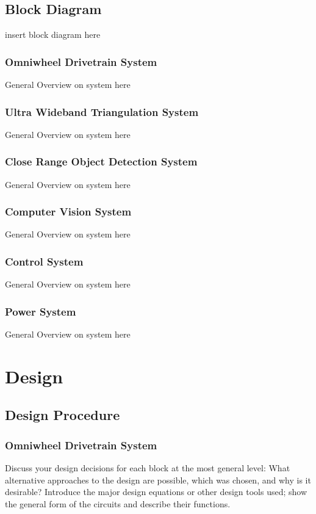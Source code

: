 \documentclass{report}
\begin{document}
    \section{Block Diagram}
    insert block diagram here 

    \subsection{Omniwheel Drivetrain System}
    General Overview on system here

    \subsection{Ultra Wideband Triangulation System}
    General Overview on system here
    
    \subsection{Close Range Object Detection System}
    General Overview on system here
    
    \subsection{Computer Vision System}
    General Overview on system here
    
    \subsection{Control System}
    General Overview on system here
    
    \subsection{Power System}
    General Overview on system here


    \chapter{Design}
    \section{Design Procedure}

    \subsection{Omniwheel Drivetrain System}
    Discuss your design decisions for each block at the most general level: What alternative approaches to the design are possible, which was chosen, and why is it desirable? Introduce the major design equations or other design tools used; show the general form of the circuits and describe their functions.
\end{document}
